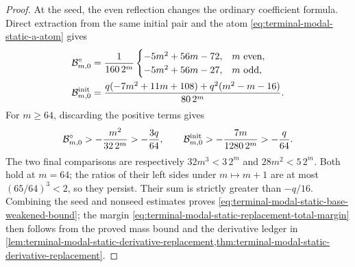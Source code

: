 \begin{proof}
At the seed, the even reflection changes the ordinary coefficient formula.
Direct extraction from the same initial pair and the atom
\eqref{eq:terminal-modal-static-a-atom} gives
\begin{align}
 \mathcal B_{m,0}^\circ
 &=\frac1{160\,2^m}
 \begin{cases}
 -5m^2+56m-72,&m\ \text{even},\\
 -5m^2+56m-27,&m\ \text{odd},
 \end{cases}\notag\\
 \mathcal B_{m,0}^{\rm init}
 &=\frac{q(-7m^2+11m+108)+q^2(m^2-m-16)}{80\,2^m}.
 \label{eq:terminal-modal-static-base-seed}
\end{align}
For $m\ge64$, discarding the positive terms gives
\[
 \mathcal B_{m,0}^\circ>-\frac{m^2}{32\,2^m}>-\frac{3q}{64},
 \qquad
 \mathcal B_{m,0}^{\rm init}>-\frac{7m}{1280\,2^m}>-\frac q{64}.
\]
The two final comparisons are respectively
$32m^3<3\,2^m$ and $28m^2<5\,2^m$.  Both hold at $m=64$; the ratios of
their left sides under $m\mapsto m+1$ are at most $(65/64)^3<2$, so they
persist.  Their sum is strictly greater than $-q/16$.
Combining the seed and nonseed estimates proves
\eqref{eq:terminal-modal-static-base-weakened-bound}; the margin
\eqref{eq:terminal-modal-static-replacement-total-margin} then follows from
the proved mass bound and the derivative ledger in
\cref{lem:terminal-modal-static-derivative-replacement,thm:terminal-modal-static-derivative-replacement}.
\end{proof}


